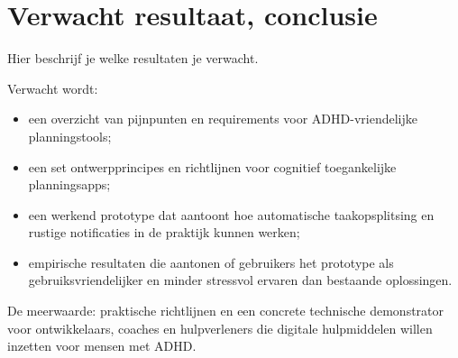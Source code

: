 \section{Verwacht resultaat, conclusie}
\label{sec:verwachte_resultaten}

Hier beschrijf je welke resultaten je verwacht.

Verwacht wordt:
\begin{itemize}
  \item een overzicht van pijnpunten en requirements voor ADHD-vriendelijke planningstools;
  \item een set ontwerpprincipes en richtlijnen voor cognitief toegankelijke planningsapps;
  \item een werkend prototype dat aantoont hoe automatische taakopsplitsing en rustige notificaties in de praktijk kunnen werken;
  \item empirische resultaten die aantonen of gebruikers het prototype als gebruiksvriendelijker en minder stressvol ervaren dan bestaande oplossingen.
\end{itemize}

De meerwaarde: praktische richtlijnen en een concrete technische demonstrator voor ontwikkelaars, coaches en hulpverleners die digitale hulpmiddelen willen inzetten voor mensen met ADHD.

